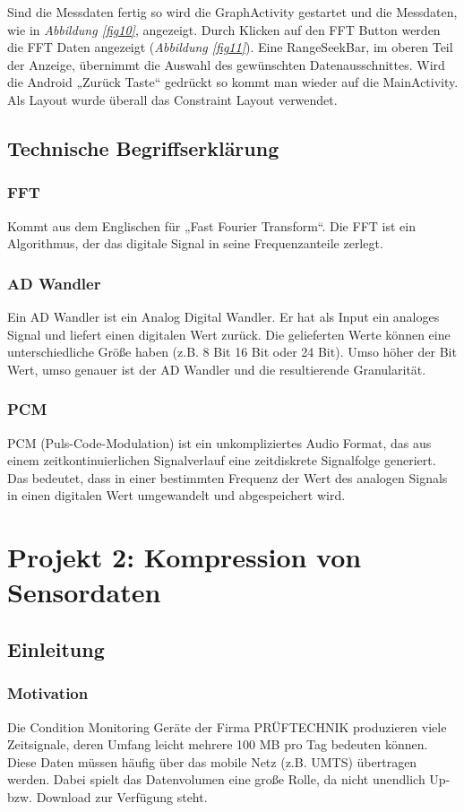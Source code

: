 \documentclass{article}
\begin{document}
{			Sind die Messdaten fertig so wird die GraphActivity gestartet und die Messdaten, wie in \textit{Abbildung \ref{fig10}}, angezeigt. Durch Klicken auf den FFT Button werden die FFT Daten angezeigt (\textit{Abbildung \ref{fig11}}).
			Eine RangeSeekBar, im oberen Teil der Anzeige, übernimmt die Auswahl des gewünschten Datenausschnittes.
			Wird die Android „Zurück Taste“ gedrückt so kommt man wieder auf die MainActivity.
			Als Layout wurde überall das Constraint Layout verwendet.
		
\newpage
	\subsection{Technische Begriffserklärung}
		\subsubsection{FFT}
						Kommt aus dem Englischen für „Fast Fourier Transform“. Die FFT ist ein Algorithmus, der das digitale Signal in seine Frequenzanteile zerlegt.

		\subsubsection{AD Wandler}
						Ein AD Wandler ist ein Analog Digital Wandler. Er hat als Input ein analoges Signal und liefert einen digitalen Wert zurück. Die gelieferten Werte können eine unterschiedliche Größe haben (z.B. 8 Bit 16 Bit oder 24 Bit). Umso höher der Bit Wert, umso genauer ist der AD Wandler und die resultierende Granularität.

		\subsubsection{PCM}
			PCM (Puls-Code-Modulation) ist ein unkompliziertes Audio Format, das aus einem zeitkontinuierlichen Signalverlauf eine zeitdiskrete Signalfolge generiert. Das bedeutet, dass in einer bestimmten Frequenz der Wert des analogen Signals in einen digitalen Wert umgewandelt und abgespeichert wird.

\section{Projekt 2: Kompression von Sensordaten} 
	\subsection{Einleitung}
		\subsubsection{Motivation}
			Die Condition Monitoring Geräte der Firma PRÜFTECHNIK produzieren viele Zeitsignale, deren Umfang leicht mehrere 100 MB pro Tag bedeuten können. Diese Daten müssen häufig über das mobile Netz (z.B. UMTS) übertragen werden. Dabei spielt das Datenvolumen eine große Rolle, da nicht unendlich Up- bzw. Download zur Verfügung steht.
}
\end{document}
